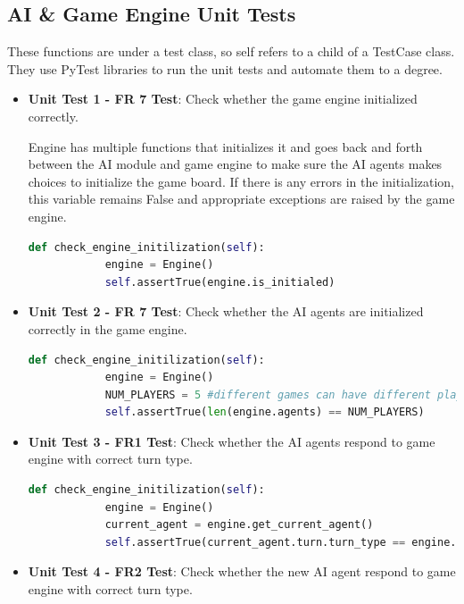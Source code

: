 \documentclass[12pt, titlepage]{article}
\begin{document}
\subsection{AI & Game Engine Unit Tests}
These functions are under a test class, so self refers to a child of a TestCase class. They use PyTest libraries to run the unit tests and automate them to a degree.
\begin{itemize}
    \item \textbf{Unit Test 1 - FR 7 Test}: Check whether the game engine initialized correctly. 
    
 Engine has multiple functions that initializes it and goes back and forth between the AI module and game engine to make sure the AI agents makes choices to initialize the game board. If there is any errors in the initialization, this variable remains False and appropriate exceptions are raised by the game engine.
    \begin{lstlisting}[language=Python]
        def check_engine_initilization(self):
            engine = Engine()
            self.assertTrue(engine.is_initialed)
    \end{lstlisting}

    \item \textbf{Unit Test 2 - FR 7 Test}: Check whether the AI agents are initialized correctly in the game engine.
    
    \begin{lstlisting}[language=Python]
        def check_engine_initilization(self):
            engine = Engine()
            NUM_PLAYERS = 5 #different games can have different players
            self.assertTrue(len(engine.agents) == NUM_PLAYERS)
    \end{lstlisting}

    \item \textbf{Unit Test 3 - FR1 Test}: Check whether the AI agents respond to game engine with correct turn type.
    
    \begin{lstlisting}[language=Python]
        def check_engine_initilization(self):
            engine = Engine()
            current_agent = engine.get_current_agent()
            self.assertTrue(current_agent.turn.turn_type == engine.turn.turn_type)
    \end{lstlisting}

    \item \textbf{Unit Test 4 - FR2 Test}: Check whether the new AI agent respond to game engine with correct turn type.
    

\end{itemize}
\end{document}
